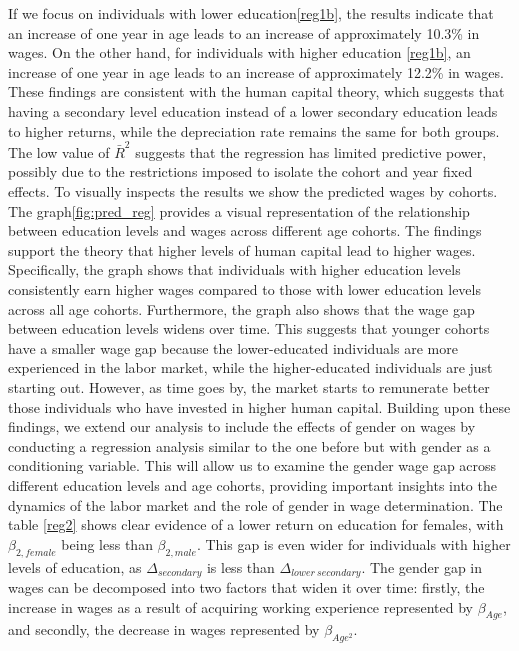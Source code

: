 \documentclass[12pt]{article}
\begin{document}
If we focus on individuals with lower education\ref{reg1b}, the results indicate that an increase of one year in age leads to an increase of approximately 10.3\% in wages. On the other hand, for individuals with higher education \ref{reg1b}, an increase of one year in age leads to an increase of approximately 12.2\% in wages. These findings are consistent with the human capital theory, which suggests that having a secondary level education instead of a lower secondary education leads to higher returns, while the depreciation rate remains the same for both groups. The low value of $\bar{R}^2$ suggests that the regression has limited predictive power, possibly due to the restrictions imposed to isolate the cohort and year fixed effects.
\newline
To visually inspects the results we show the predicted
wages by cohorts.
\newline
The graph\ref{fig:pred_reg} provides a visual representation of the relationship between education levels and wages across different age cohorts. The findings support the theory that higher levels of human capital lead to higher wages. Specifically, the graph shows that individuals with higher education levels consistently earn higher wages compared to those with lower education levels across all age cohorts.
\newline
Furthermore, the graph also shows that the wage gap between education levels widens over time. This suggests that younger cohorts have a smaller wage gap because the lower-educated individuals are more experienced in the labor market, while the higher-educated individuals are just starting out. However, as time goes by, the market starts to remunerate better those individuals who have invested in higher human capital.
\newline
Building upon these findings, we extend our analysis to include the effects of gender on wages by conducting a regression analysis similar to the one before but with gender as a conditioning variable. This will allow us to examine the gender wage gap across different education levels and age cohorts, providing important insights into the dynamics of the labor market and the role of gender in wage determination.
\newline
The table \ref{reg2} shows clear evidence of a lower return on education for females, with $\beta_{2,female}$ being less than $\beta_{2,male}$. This gap is even wider for individuals with higher levels of education, as $\Delta_{secondary}$ is less than $\Delta_{lower\ secondary}$. 
The gender gap in wages can be decomposed into two factors that widen it over time: firstly, the increase in wages as a result of acquiring working experience represented by $\beta_{Age}$, and secondly, the decrease in wages represented by $\beta_{Age^2}$.
\end{document}
